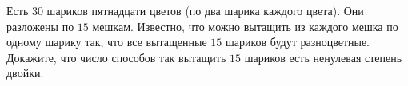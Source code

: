 Есть $30$ шариков пятнадцати цветов (по два шарика каждого цвета). Они разложены по $15$ мешкам. Известно, что можно вытащить из каждого мешка по одному шарику так, что все вытащенные $15$ шариков будут разноцветные. Докажите, что число способов так вытащить $15$ шариков есть ненулевая степень двойки.